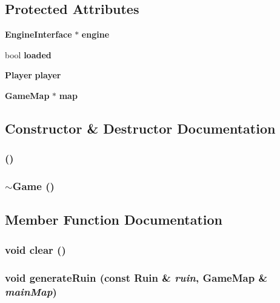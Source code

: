\subsection*{Protected Attributes}
\begin{CompactItemize}
\item 
{\bf Engine\-Interface} $\ast$ {\bf engine}
\item 
bool {\bf loaded}
\item 
{\bf Player} {\bf player}
\item 
{\bf Game\-Map} $\ast$ {\bf map}
\end{CompactItemize}


\subsection{Constructor \& Destructor Documentation}
\subsubsection{ ()}\label{classGame_a0}


\subsubsection{\setlength{\rightskip}{0pt plus 5cm}$\sim${\bf Game} ()\hspace{0.3cm}{\tt  [virtual]}}\label{classGame_a1}




\subsection{Member Function Documentation}
\subsubsection{\setlength{\rightskip}{0pt plus 5cm}void clear ()\hspace{0.3cm}{\tt  [protected]}}\label{classGame_b0}


\subsubsection{\setlength{\rightskip}{0pt plus 5cm}void generate\-Ruin (const {\bf Ruin} \& {\em ruin}, {\bf Game\-Map} \& {\em main\-Map})\hspace{0.3cm}{\tt  [protected]}}\label{classGame_b3}


